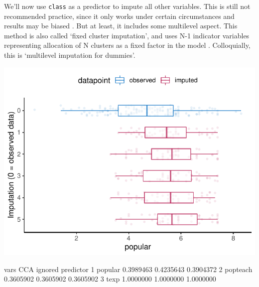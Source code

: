\documentclass[
]{jss}
\begin{document}
We'll now use \texttt{class} as a predictor to impute all other
variables. This is still not recommended practice, since it only works
under certain circumstances and results may be biased
\citep{drec15, ende16}. But at least, it includes some multilevel
aspect. This method is also called `fixed cluster imputation', and uses
N-1 indicator variables representing allocation of N clusters as a fixed
factor in the model \citep{reit06, ende2016}. Colloquially, this is
`multilevel imputation for dummies'.

\begin{CodeChunk}
\end{CodeChunk}

\begin{CodeChunk}


\begin{center}\includegraphics{Manuscript_files/figure-latex/pop_predictor_eval-1} \end{center}

\begin{CodeOutput}
      vars       CCA   ignored predictor
1  popular 0.3989463 0.4235643 0.3904372
2 popteach 0.3605902 0.3605902 0.3605902
3     texp 1.0000000 1.0000000 1.0000000
\end{CodeOutput}
\end{CodeChunk}
\end{document}
